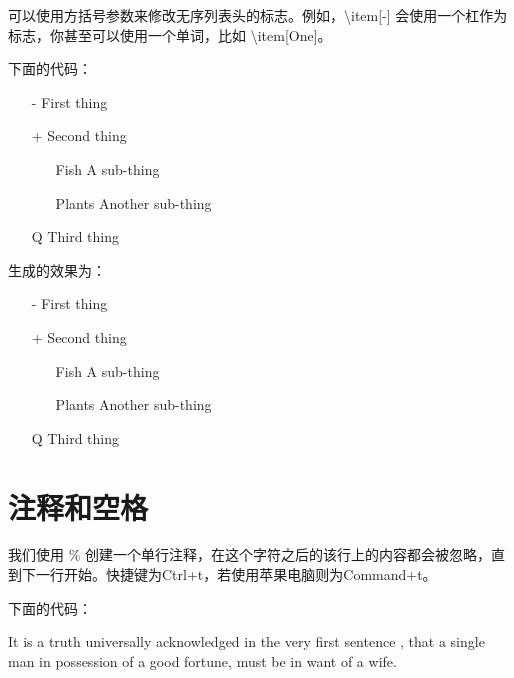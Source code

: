 可以使用方括号参数来修改无序列表头的标志。例如，\textbackslash item[-] 会使用一个杠作为标志，你甚至可以使用一个单词，比如 \textbackslash item[One]。

下面的代码：

\begin{python}
\begin{itemize}
	\item[-] First thing
	
	\item[+] Second thing
	\begin{itemize}
		\item[Fish] A sub-thing
		
		\item[Plants] Another sub-thing
	\end{itemize}
	
	\item[Q] Third thing
\end{itemize}
\end{python}


生成的效果为：

\begin{itemize}
	\item[-] First thing
	
	\item[+] Second thing
	\begin{itemize}
		\item[Fish] A sub-thing
		
		\item[Plants] Another sub-thing
	\end{itemize}
	
	\item[Q] Third thing
\end{itemize}

\section{注释和空格}

我们使用 \% 创建一个单行注释，在这个字符之后的该行上的内容都会被忽略，直到下一行开始。快捷键为Ctrl+t，若使用苹果电脑则为Command+t。

下面的代码：

\begin{python}
It is a truth universally acknowledged %
in the very first sentence , 
that a single man in possession of a good fortune,
must be in want of a wife.
\end{python}

